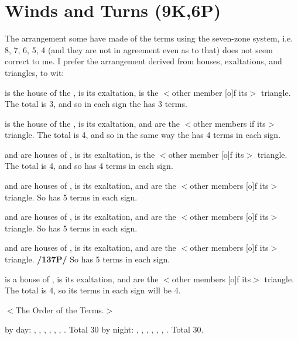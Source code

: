 \section{Winds and Turns (9K,6P)}

The arrangement some have made of the terms using the seven-zone system, i.e. 8, 7, 6, 5, 4 (and they are not in agreement even as to that) does not seem correct to me. I prefer the arrangement derived from houses, exaltations, and triangles, to wit:

\Leo\xspace is the house of the \Sun, \Aries\xspace is its exaltation, \Sagittarius\xspace is the $<$other member [o]f its$>$ triangle. The total is 3, and so in each sign the \Sun\xspace has 3 terms.

\Cancer\xspace is the house of the \Moon, \Taurus\xspace is its exaltation, \Virgo\xspace and \Capricorn\xspace are the $<$other members if its$>$ triangle. The total is 4, and so in the same way the \Moon has 4 terms in each sign.

\Capricorn\xspace and \Aquarius\xspace are houses of \Saturn, \Libra is its exaltation, \Gemini\xspace is the $<$other member [o]f its$>$ triangle. The total is 4, and so \Saturn\xspace has 4 terms in each sign.

\Sagittarius\xspace and \Pisces\xspace are houses of \Jupiter, \Cancer\xspace is its exaltation, \Aries\xspace and \Leo\xspace are the $<$other members [o]f its$>$ triangle. So \Jupiter\xspace has 5 terms in each sign.

\Aries\xspace and \Scorpio\xspace are houses of \Mars, \Capricorn\xspace is its exaltation, \Pisces\xspace and \Cancer\xspace are the $<$other members [o]f its$>$ triangle. So \Mars\xspace has 5 terms in each sign.

\Taurus\xspace and \Libra\xspace are houses of \Venus, \Pisces\xspace is its exaltation, \Virgo\xspace and \Capricorn\xspace are the $<$other members [o]f its$>$ triangle. \textbf{/137P/} So \Venus\xspace has 5 terms in each sign.

\Gemini\xspace is a house of \Mercury, \Virgo\xspace is its exaltation, \Aquarius\xspace and \Libra\xspace are the $<$other members [o]f its$>$ triangle. The total is 4, so its terms in each sign will be 4.

$<$The Order of the Terms.$>$

\Aries\xspace \Leo\xspace \Sagittarius\xspace by day: , , , , , , . Total 30 by night: , , , , , , . Total 30.

